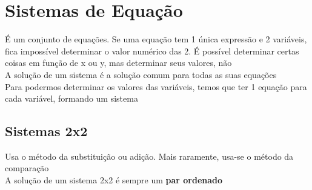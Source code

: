 \documentclass{article}
\begin{document}
\section{Sistemas de Equação}
É um conjunto de equações. Se uma equação tem 1 única expressão e 2 variáveis, fica impossível determinar o valor numérico das 2. É possível determinar certas coisas em função de x ou y, mas determinar seus valores, não
\\[5pt]
A solução de um sistema é a solução comum para todas as suas equações
\\[5pt]
Para podermos determinar os valores das variáveis, temos que ter 1 equação para cada variável, formando um sistema
\subsection{Sistemas 2x2}
Usa o método da substituição ou adição. Mais raramente, usa-se o método da comparação
\\[5pt]
A solução de um sistema 2x2 é sempre um \textbf{par ordenado}
\end{document}
